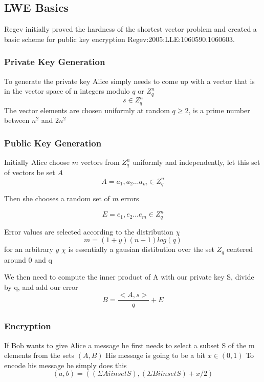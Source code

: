 \documentclass{article}
\begin{document}
\subsection{LWE Basics}
Regev initially proved the hardness of the shortest vector problem and created a basic scheme for public key encryption {Regev:2005:LLE:1060590.1060603}. 
\subsubsection{Private Key Generation}
To generate the private key Alice simply needs to come up with a vector that is in the vector space of n integers modulo $q$ or $Z_q^n$
\begin{equation*}
	s \in Z_q^n
\end{equation*}
The vector elements are chosen uniformly at random
$q \geq 2$, is a prime number between $n^2$ and $2n^2$

\subsubsection{Public Key Generation}
Initially Alice choose $m$ vectors from $Z_q^n$ uniformly and independently, let this set of vectors be set $A$
\begin{equation*}
A = a_1, a_2… a_m \in Z_q^n
\end{equation*}

Then she chooses a random set of $m$ errors

\begin{equation*}
E = e_1, e_2… e_m \in Z_q^n
\end{equation*}

Error values are selected according to the distribution $\chi$
\begin{equation*}
m = (1+y)(n+1)log(q) 
\end{equation*}
for an arbitrary $y$
$\chi$ is essentially a gausian distibution over the set $Z_q$ centered around 0 and q

We then need to compute the inner product of A with our private key S, divide by q, and add our error
\begin{equation*}
B = \frac{<A,s>}{q} + E 
\end{equation*}

\subsubsection{Encryption}
If Bob wants to give Alice a message he first needs to select a subset S of the m elements from the sets $(A,B)$
His message is going to be a bit $x \in (0,1)$
To encode his message he simply does this
\begin{equation*}
(a, b) = ((ΣAi in set S), (ΣBi in set S) + x/2)
\end{equation*}
\end{document}
